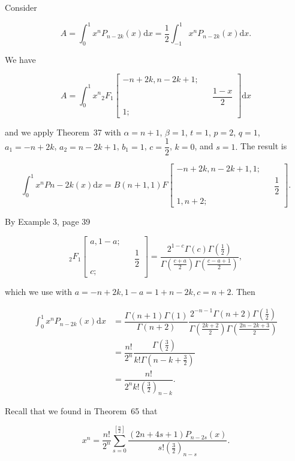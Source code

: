 \begin{solution}
Consider

$$A = \displaystyle\int_0^1 x^n P_{n-2k}(x)\mathrm{d}x = \dfrac{1}{2} \displaystyle\int_{-1}^1 x^n P_{n-2k}(x) \mathrm{d}x.$$

We have

$$A = \displaystyle\int_0^1 x^n {}_2F_1 \left[ \begin{array}{rlr}
-n+2k, n-2k+1; & & \\
& & \dfrac{1-x}{2} \\
1; & & 
\end{array} \right] \mathrm{d}x$$

and we apply Theorem~37 with $\alpha=n+1$, $\beta=1$, $t=1$, $p=2$, $q=1$, $a_1=-n+2k$, $a_2=n-2k+1$, $b_1=1$, $c=\dfrac{1}{2}$, $k=0$, and $s=1.$ The result is

$$\displaystyle\int_0^1 x^n P{n-2k}(x) \mathrm{d}x = B(n+1,1) F \left[ \begin{array}{rlr}
-n+2k, n-2k+1, 1; & & \\
& & \dfrac{1}{2} \\
1, n+2; & & 
\end{array} \right].$$

By Example 3, page 39

$${}_2F_1 \left[ \begin{array}{rlr}
a, 1-a; & & \\
& & \dfrac{1}{2} \\
c; & & 
\end{array} \right] = \dfrac{2^{1-c} \Gamma(c) \Gamma( \frac{1}{2} )}{\Gamma ( \frac{c+a}{2} ) \Gamma( \frac{c-a+1}{2} )},$$

which we use with $a=-n+2k, 1-a=1+n-2k,c=n+2.$ Then

$$\begin{array}{ll}
\displaystyle\int_0^1 x^n P_{n-2k}(x) \mathrm{d}x &= \dfrac{\Gamma(n+1)\Gamma(1)}{\Gamma(n+2)} \dfrac{2^{-n-1} \Gamma(n+2) \Gamma( \frac{1}{2} )}{\Gamma( \frac{2k+2}{2} ) \Gamma ( \frac{2n-2k+3}{2} )} \\
&= \dfrac{n!}{2^n} \dfrac{\Gamma(\frac{3}{2})}{k! \Gamma(n-k+\frac{3}{2})} \\
&= \dfrac{n!}{2^n k! (\frac{3}{2})_{n-k}}.
\end{array}$$

Recall that we found in Theorem~65 that

$$x^n = \dfrac{n!}{2^n} \displaystyle\sum_{s=0}^{[\frac{n}{2}]} \dfrac{(2n+4s+1)P_{n-2s}(x)}{s! (\frac{3}{2})_{n-s}}.$$


\end{solution}

